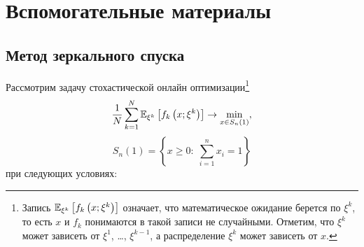 \section{Вспомогательные материалы}

\subsection*{Метод зеркального спуска}

Рассмотрим задачу стохастической онлайн оптимизации\footnote{ Запись $\mathrm{{\mathbb E}}_{\xi 
^k} \left[ {f_k \left( {x;\xi ^k} \right)} \right]$ означает, что 
математическое ожидание берется по $\xi^k$, то есть $x$ и $f_k $ понимаются 
в такой записи не случайными. Отметим, что $\xi ^k$ может зависеть от $\xi 
^1$, {\ldots}, $\xi ^{k-1}$, а распределение $\xi^k$ может зависеть от $x$.}
\begin{equation}
\label{eq1}
\frac{1}{N}\sum\limits_{k=1}^N {\mathrm{{\mathbb E}}_{\xi ^k} \left[ {f_k \left( {x;\xi ^k} 
\right)} \right]} \to \mathop {\min }\limits_{x\in S_n \left( 1 \right)} 
,
\end{equation}
\[
S_n \left( 1 \right)=\left\{ {x\ge 0: \; \sum\limits_{i=1}^n {x_i =1} } 
\right\}
\]
при следующих условиях:

